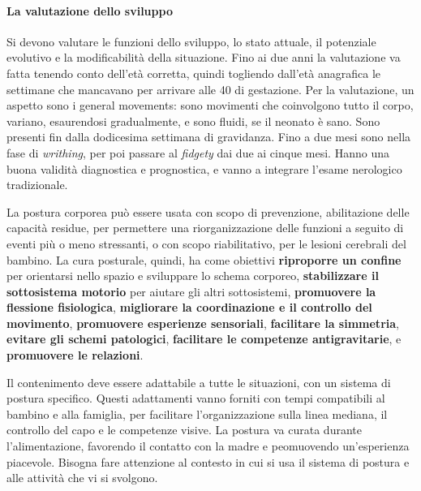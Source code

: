 \paragraph{La valutazione dello sviluppo}
Si devono valutare le funzioni dello sviluppo, lo stato attuale, il potenziale evolutivo e la modificabilità della situazione.
Fino ai due anni la valutazione va fatta tenendo conto dell'età corretta, quindi togliendo dall'età anagrafica le settimane
che mancavano per arrivare alle 40 di gestazione.
Per la valutazione, un aspetto sono i general movements: sono movimenti che coinvolgono tutto il corpo, variano, esaurendosi
gradualmente, e sono fluidi, se il neonato è sano. Sono presenti fin dalla dodicesima settimana di gravidanza. Fino a due mesi
sono nella fase di \textit{writhing}, per poi passare al \textit{fidgety} dai due ai cinque mesi. Hanno una buona validità
diagnostica e prognostica, e vanno a integrare l'esame nerologico tradizionale.

La postura corporea può essere usata con scopo di prevenzione, abilitazione delle capacità residue, per permettere una
riorganizzazione delle funzioni a seguito di eventi più o meno stressanti, o con scopo riabilitativo, per le lesioni cerebrali
del bambino.
La cura posturale, quindi, ha come obiettivi \textbf{riproporre un confine} per orientarsi nello spazio e sviluppare lo schema
corporeo, \textbf{stabilizzare il sottosistema motorio} per aiutare gli altri sottosistemi, \textbf{promuovere la flessione
fisiologica}, \textbf{migliorare la coordinazione e il controllo del movimento}, \textbf{promuovere esperienze sensoriali},
\textbf{facilitare la simmetria}, \textbf{evitare gli schemi patologici}, \textbf{facilitare le competenze antigravitarie}, e
\textbf{promuovere le relazioni}.

Il contenimento deve essere adattabile a tutte le situazioni, con un sistema di postura specifico. Questi adattamenti vanno
forniti con tempi compatibili al bambino e alla famiglia, per facilitare l'organizzazione sulla linea mediana, il controllo del
capo e le competenze visive.
La postura va curata durante l'alimentazione, favorendo il contatto con la madre e peomuovendo un'esperienza piacevole. Bisogna
fare attenzione al contesto in cui si usa il sistema di postura e alle attività che vi si svolgono.
